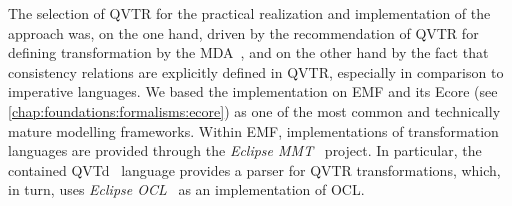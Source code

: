 

The selection of \gls{QVTR} for the practical realization and implementation of the approach was, on the one hand, driven by the recommendation of \gls{QVTR} for defining transformation by the \gls{MDA}~\cite{mda}, and on the other hand by the fact that consistency relations are explicitly defined in \gls{QVTR}, especially in comparison to imperative languages.
We based the implementation on \gls{EMF} and its Ecore \metametamodel (see \autoref{chap:foundations:formalisms:ecore}) as one of the most common and technically mature modelling frameworks.
Within \gls{EMF}, implementations of transformation languages are provided through the \emph{Eclipse MMT}~\cite{EclipseMMT} project.
In particular, the contained \gls{QVTd}~\cite{EclipseQVTd} language provides a parser for \gls{QVTR} transformations, which, in turn, uses \emph{Eclipse OCL}~\cite{EclipseOCL} as an implementation of \gls{OCL}.


